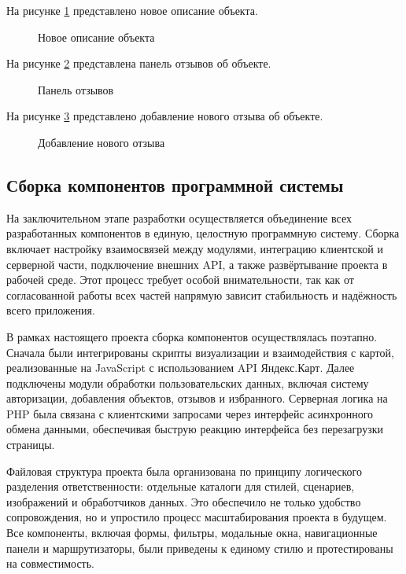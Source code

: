 \newpage
На рисунке \ref{r18:image} представлено новое описание объекта.

\begin{figure}[H]
	\center{\texttt{[image: r18]}}
	\caption{Новое описание объекта}
	\label{r18:image}
\end{figure}

\newpage
На рисунке \ref{r19:image} представлена панель отзывов об объекте.

\begin{figure}[H]
	\center{\texttt{[image: r19]}}
	\caption{Панель отзывов}
	\label{r19:image}
\end{figure}

\newpage
На рисунке \ref{r20:image} представлено добавление нового отзыва об объекте.

\begin{figure}[H]
	\center{\texttt{[image: r20]}}
	\caption{Добавление нового отзыва}
	\label{r20:image}
\end{figure}

\subsection{Сборка компонентов программной системы}

На заключительном этапе разработки осуществляется объединение всех разработанных компонентов в единую, целостную программную систему. Сборка включает настройку взаимосвязей между модулями, интеграцию клиентской и серверной части, подключение внешних API, а также развёртывание проекта в рабочей среде. Этот процесс требует особой внимательности, так как от согласованной работы всех частей напрямую зависит стабильность и надёжность всего приложения.

В рамках настоящего проекта сборка компонентов осуществлялась поэтапно. Сначала были интегрированы скрипты визуализации и взаимодействия с картой, реализованные на JavaScript с использованием API Яндекс.Карт. Далее подключены модули обработки пользовательских данных, включая систему авторизации, добавления объектов, отзывов и избранного. Серверная логика на PHP была связана с клиентскими запросами через интерфейс асинхронного обмена данными, обеспечивая быструю реакцию интерфейса без перезагрузки страницы.

Файловая структура проекта была организована по принципу логического разделения ответственности: отдельные каталоги для стилей, сценариев, изображений и обработчиков данных. Это обеспечило не только удобство сопровождения, но и упростило процесс масштабирования проекта в будущем. Все компоненты, включая формы, фильтры, модальные окна, навигационные панели и маршрутизаторы, были приведены к единому стилю и протестированы на совместимость.

